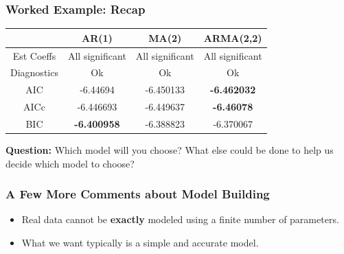 \documentclass[%
xcolor=pdftex]{beamer}
\begin{document}
\begin{frame}[fragile]
\frametitle{Worked Example: Recap}

\begin{tabular}{c|c|c|c} %
      & \textbf{AR(1)} & \textbf{MA(2)} & \textbf{ARMA(2,2)}\\
			\hline
      Est Coeffs& All significant & All significant & All significant\\
      Diagnostics & Ok & Ok & Ok\\
      AIC & -6.44694 & -6.450133 & \textbf{-6.462032}\\
			AICc & -6.446693 & -6.449637 & \textbf{-6.46078}\\
			BIC & \textbf{-6.400958} & -6.388823 & -6.370067\\
    \end{tabular}

\textbf{Question:} Which model will you choose? What else could be done to help us decide which model to choose?

\end{frame}


\begin{frame}
\frametitle{A Few More Comments about Model Building}

\begin{itemize}
\item Real data cannot be \textbf{exactly} modeled using a finite number of parameters.
\item What we want typically is a simple and accurate model.
\end{itemize}

\end{frame}
\end{document}
